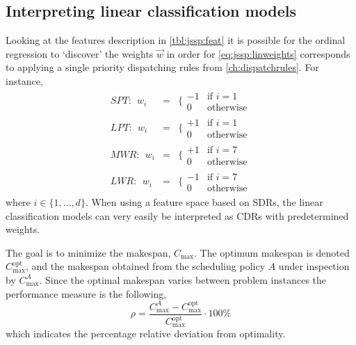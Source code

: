\documentclass[smallextended]{svjour3}
\renewcommand{\vphi}{\bm{\phi}}
\begin{document}
\subsection{Interpreting linear classification 
	models}\label{sec:learningmodels:interpret}
Looking at the features description in \cref{tbl:jssp:feat} it is possible for 
the ordinal regression to `discover' the weights $\vec{w}$ in order for 
\eqref{eq:jssp:linweights} corresponds to applying a single priority 
dispatching rules from \cref{ch:dispatchrules}. For instance, 
\begin{eqnarray*} %
	SPT:~~w_i&=&\bigg\{ \begin{array}{rl}-1&\text{if 
		}i=1\\0&\text{otherwise}\end{array} \\
	LPT:~~w_i&=&\bigg\{ \begin{array}{rl}+1&\text{if 
		}i=1\\0&\text{otherwise}\end{array} \\
	MWR:~~w_i&=&\bigg\{ \begin{array}{rl}+1&\text{if 
		}i=7\\0&\text{otherwise}\end{array} \\
	LWR:~~w_i&=&\bigg\{ \begin{array}{rl}-1&\text{if 
		}i=7\\0&\text{otherwise}\end{array}
\end{eqnarray*}
where $i\in\{1,\ldots,d\}$. %
When using a feature space based on SDRs, the linear classification models can 
very easily be interpreted as CDRs with predetermined weights.


The goal is to minimize the makespan, $C_{\max}$. The optimum 
makespan is denoted $C_{\max}^{\text{opt}}$, and the makespan obtained from the 
scheduling policy $A$ under inspection by $C_{\max}^{A}$. Since the optimal 
makespan varies between problem instances the performance measure is the 
following,
\begin{equation}\label{eq:ratio}
	\rho=\frac{C_{\max}^{A}-C_{\max}^{\text{opt}}}{C_{\max}^{\text{opt}}}\cdot
	100\%
\end{equation}
which indicates the percentage relative deviation from optimality. %
\end{document}
